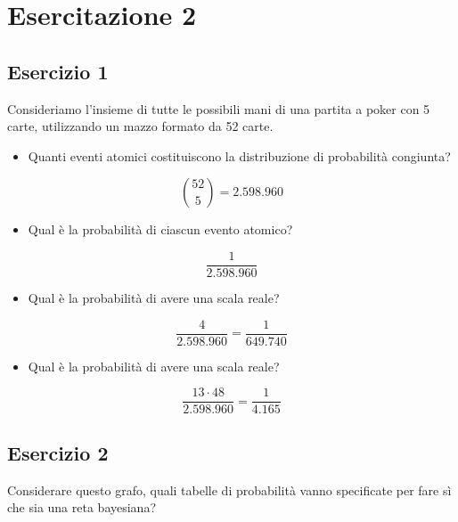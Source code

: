 \documentclass{article}
\begin{document}
	\section{Esercitazione 2}
	
	\subsection{Esercizio 1}
	
	Consideriamo l’insieme di tutte le possibili mani di una partita a poker con 5
	carte, utilizzando un mazzo formato da 52 carte. 
	
	\begin{itemize}
		\item Quanti eventi atomici costituiscono la distribuzione di probabilità congiunta? 
	\end{itemize}

\[
\binom{52}{5} = 2.598.960
\]
	
		\begin{itemize}
		 \item	Qual è la probabilità di ciascun evento atomico? 
		\end{itemize}
\[
\frac{1}{2.598.960}
\]

		\begin{itemize}
	\item Qual è la probabilità di avere una scala reale?
\end{itemize}
\[
\frac{4}{2.598.960} = \frac{1}{649.740}
\]

		\begin{itemize}
	\item Qual è la probabilità di avere una scala reale?
\end{itemize}

\[
\frac{13 \cdot 48}{2.598.960} = \frac{1}{4.165}
\]

\pagebreak
\subsection{Esercizio 2}
Considerare questo grafo, quali tabelle di probabilità vanno specificate per fare sì che sia una reta bayesiana?
 \begin{center}
 	
\end{center}
\end{document}
